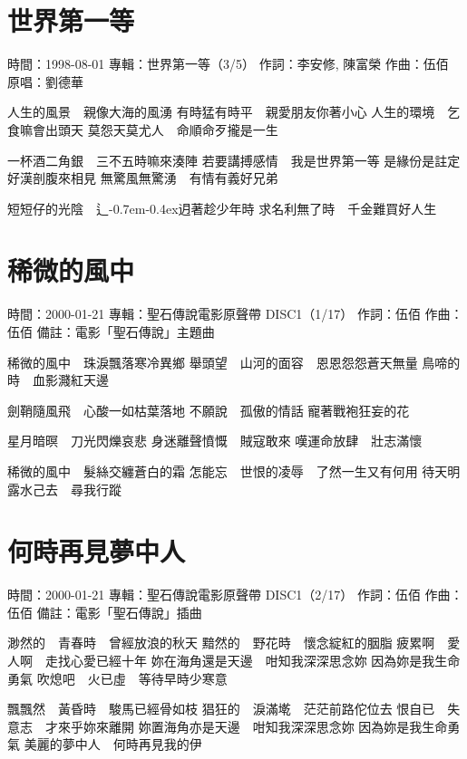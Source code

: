 \documentclass[UTF8,a4paper,oneside,twocolumn,12pt]{ctexbook}
\newcommand{\infopair}[2]{\textbullet #1：#2}
\newcommand{\zc}[1][伍佰]{\infopair{作詞}{#1}}
\newcommand{\zq}[1][伍佰]{\infopair{作曲}{#1}}
\newcommand{\zj}[1]{\infopair{專輯}{#1}}
\newcommand{\yc}[1]{\infopair{原唱}{#1}}
\newcommand{\sj}[1]{\infopair{時間}{#1}}
\newcommand{\bz}[1]{\infopair{備註}{#1}}
\newcommand{\tshittho}{\hbox{辶\kern-0.7em\lower-0.4ex\hbox{\scalebox{0.7}{日}}}迌}
\newenvironment{info}{\begin{flushleft}\kaishu
	}
	{\end{flushleft}\normalsize\yahei\par}
\newenvironment{lyric}{
	}
{}
\begin{document}
\section{世界第一等}
\begin{info}
	\sj{1998-08-01}
	\zj{世界第一等（3/5）}
	\zc[李安修, 陳富榮]
	\zq
	\yc{劉德華}
\end{info}
\begin{lyric}
	人生的風景　親像大海的風湧
	有時猛有時平　親愛朋友你著小心
	人生的環境　乞食嘛會出頭天
	莫怨天莫尤人　命順命歹攏是一生

	一杯酒二角銀　三不五時嘛來湊陣
	若要講搏感情　我是世界第一等
	是緣份是註定　好漢剖腹來相見
	無驚風無驚湧　有情有義好兄弟

	短短仔的光陰　\tshittho{}著趁少年時
	求名利無了時　千金難買好人生
\end{lyric}

\section{稀微的風中}
\begin{info}
	\sj{2000-01-21}
	\zj{聖石傳說電影原聲帶 DISC1（1/17）}
	\zc
	\zq
	\bz{電影「聖石傳說」主題曲}
\end{info}
\begin{lyric}
	稀微的風中　珠淚飄落寒冷異鄉
	舉頭望　山河的面容　恩恩怨怨蒼天無量
	鳥啼的時　血影濺紅天邊

	劍鞘隨風飛　心酸一如枯葉落地
	不願說　孤傲的情話
	寵著戰袍狂妄的花

	星月暗暝　刀光閃爍哀悲
	身迷離聲憤慨　賊寇敢來
	嘆運命放肆　壯志滿懷

	稀微的風中　髮絲交纏蒼白的霜
	怎能忘　世恨的凌辱　了然一生又有何用
	待天明露水己去　尋我行蹤
\end{lyric}

\section{何時再見夢中人}
\begin{info}
	\sj{2000-01-21}
	\zj{聖石傳說電影原聲帶 DISC1（2/17）}
	\zc
	\zq
	\bz{電影「聖石傳說」插曲}
\end{info}
\begin{lyric}
	渺然的　青春時　曾經放浪的秋天
	黯然的　野花時　懷念綻紅的胭脂
	疲累啊　愛人啊　走找心愛已經十年
	妳在海角還是天邊　咁知我深深思念妳
	因為妳是我生命勇氣
	吹熄吧　火已虛　等待早時少寒意

	飄飄然　黃昏時　駿馬已經骨如枝
	猖狂的　淚滿墘　茫茫前路佗位去
	恨自已　失意志　才來乎妳來離開
	妳置海角亦是天邊　咁知我深深思念妳
	因為妳是我生命勇氣
	美麗的夢中人　何時再見我的伊
\end{lyric}
\end{document}
